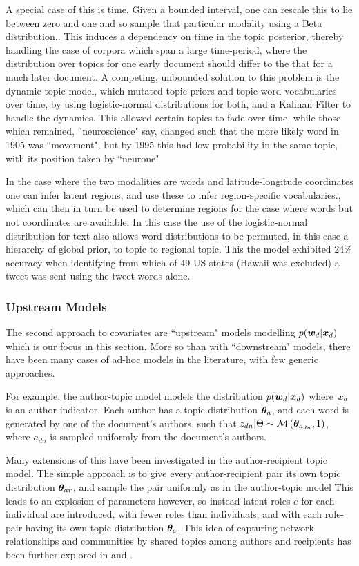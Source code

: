 A special case of this is time. Given a bounded interval, one can rescale this to lie between zero and one and so sample that particular modality using a Beta distribution.\cite{Wang2006}. This induces a dependency on time in the topic posterior, thereby handling the case of corpora which span a large time-period, where the distribution over topics for one early document should differ to the that for a much later document. A competing, unbounded solution to this problem is the dynamic topic model\cite{Blei2006a}, which mutated topic priors and topic word-vocabularies over time, by using logistic-normal distributions for both, and a Kalman Filter to handle the dynamics. This allowed certain topics to fade over time, while those which remained, ``neuroscience" say, changed such that the more likely word in 1905 was ``movement", but by 1995 this had low probability in the same topic, with its position taken by ``neurone"

In the case where the two modalities are words and latitude-longitude coordinates one can infer latent regions, and use these to infer region-specific vocabularies\cite{Eisenstein2010}., which can then in turn be used to determine regions for the case where words but not coordinates are available. In this case the use of the logistic-normal distribution for text also allows word-distributions to be permuted, in this case a hierarchy of global prior, to topic to regional topic. This the model exhibited 24\% accuracy when identifying from which of 49 US states (Hawaii was excluded) a tweet was sent using the tweet words alone.

\subsubsection{Upstream Models}
The second approach to covariates are ``upstream" models modelling $p({ \bm w_d } | { \bm x_d })$ which is our focus in this section. More so than with ``downstream" models, there have been many cases of ad-hoc models in the literature, with few generic approaches.

For example, the author-topic model\cite{RosenZvi2004} models the distribution $p({ \bm w_d } | { \bm x_d })$ where ${ \bm x_d }$ is an author indicator. Each author has a topic-distribution $\bm \theta_a$, and each word is generated by one of the document's authors, such that $z_{dn} | \Theta \sim \mathcal{M} \left( {\bm \theta_{a_{dn}}},{1} \right)$, where $a_{dn}$ is sampled uniformly from the document's authors.

Many extensions of this have been investigated in the author-recipient topic model\cite{MacCallum2007}. The simple approach is to give every author-recipient pair its own topic distribution $\bm \theta_{ar}$, and sample the pair uniformly as in the author-topic model This leads to an explosion of parameters however, so instead latent roles $e$ for each individual are introduced, with fewer roles than individuals, and with each role-pair having its own topic distribution $\bm \theta_e$. This idea of capturing network relationships and communities by shared topics among authors and recipients has been further explored in \cite{Sachan2012} and \cite{Kang2013}.

